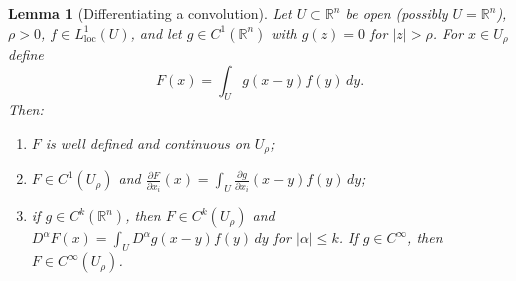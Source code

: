 \documentclass[11pt]{article}
\theoremstyle{plain}
\newtheorem{lemma}[theorem]{Lemma}
\theoremstyle{definition}
\theoremstyle{remark}
\begin{document}
\begin{lemma}[Differentiating a convolution]\label{lem:diffconv}
Let $U \subset \mathbb{R}^n$ be open (possibly $U = \mathbb{R}^n$), $\rho > 0$, $f \in L^1_{\mathrm{loc}}(U)$, and let $g \in C^1(\mathbb{R}^n)$ with $g(z) = 0$ for $|z| > \rho$. For $x \in U_\rho$ define
$$ F(x) = \int_U g(x - y) f(y)\, dy. $$
Then:
\begin{enumerate}
    \item[(a)] $F$ is well defined and continuous on $U_\rho$;
    \item[(b)] $F \in C^1(U_\rho)$ and $\displaystyle \frac{\partial F}{\partial x_i}(x) = \int_U \frac{\partial g}{\partial x_i}(x-y) f(y)\, dy$;
    \item[(c)] if $g \in C^k(\mathbb{R}^n)$, then $F \in C^k(U_\rho)$ and $D^\alpha F(x) = \int_U D^\alpha g(x-y) f(y)\, dy$ for $|\alpha| \leq k$. If $g \in C^\infty$, then $F \in C^\infty(U_\rho)$.
\end{enumerate}
\end{lemma}
\end{document}
